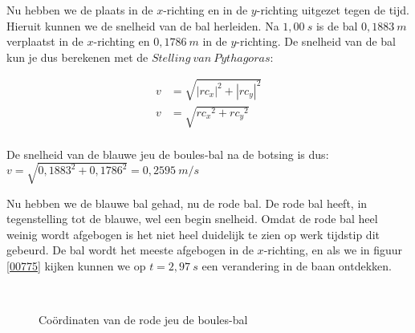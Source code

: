 \documentclass[12pt,a4paper]{article}
\begin{document}
	Nu hebben we de plaats in de $x$-richting en in de $y$-richting uitgezet tegen de tijd. Hieruit kunnen we de snelheid van de bal herleiden. Na $1,00\ s$ is de bal $0,1883\ m$ verplaatst in de $x$-richting en $0,1786\ m$ in de $y$-richting. De snelheid van de bal kun je dus berekenen met de $Stelling\ van\ Pythagoras$:

	\begin{equation}
		\label{snelheid}
		\begin{aligned}
			v&=\sqrt{{|rc_x|}^2+{|rc_y|}^2}\\
			v&=\sqrt{{rc_x}^2+{rc_y}^2}\\
		\end{aligned}
	\end{equation}

	De snelheid van de blauwe jeu de boules-bal na de botsing is dus: $v=\sqrt{{0,1883}^2+{0,1786}^2}=0,2595\ m/s$

	Nu hebben we de blauwe bal gehad, nu de rode bal. De rode bal heeft, in tegenstelling tot de blauwe, wel een begin snelheid. Omdat de rode bal heel weinig wordt afgebogen is het niet heel duidelijk te zien op werk tijdstip dit gebeurd. De bal wordt het meeste afgebogen in de $x$-richting, en als we in figuur \ref{00775} kijken kunnen we op $t=2,97\ s$ een verandering in de baan ontdekken.

	\begin{figure}[H]
		\centering
		\,
		
		\caption{Co\"{o}rdinaten van de rode jeu de boules-bal}
	\end{figure}
\end{document}
